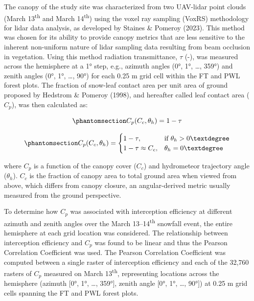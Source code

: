 \documentclass[
  letterpaper,
]{tex/uofsthesis-cs}
\begin{document}
The canopy of the study site was characterized from two UAV-lidar point
clouds (March 13\textsuperscript{th} and March 14\textsuperscript{th})
using the voxel ray sampling (VoxRS) methodology for lidar data
analysis, as developed by Staines \& Pomeroy (2023). This method was
chosen for its ability to provide canopy metrics that are less sensitive
to the inherent non-uniform nature of lidar sampling data resulting from
beam occlusion in vegetation. Using this method radiation transmittance,
\(\tau\) (-), was measured across the hemisphere at a 1° step, e.g.,
azimuth angles (0°, 1°, \ldots, 359°) and zenith angles (0°, 1°, \ldots,
90°) for each 0.25 m grid cell within the FT and PWL forest plots. The
fraction of snow-leaf contact area per unit area of ground proposed by
Hedstrom \& Pomeroy (1998), and hereafter called leaf contact area
(\(C_p\)), was then calculated as:

\begin{equation}\phantomsection\label{eq-lca}{
C_p(C_c, \theta_h) = 1-\tau
}\end{equation}

\begin{equation}\phantomsection\label{eq-tf-ode}{
C_p(C_c, \theta_h) = \begin{cases}
    1-\tau,& \text{if } \theta_h> 0°\\
    1-\tau \approx C_c ,              & \theta_h= 0°
\end{cases}
}\end{equation}

where \(C_p\) is a function of the canopy cover (\(C_c\)) and
hydrometeor trajectory angle (\(\theta_h\)). \(C_c\) is the fraction of
canopy area to total ground area when viewed from above, which differs
from canopy closure, an angular-derived metric usually measured from the
ground perspective.

To determine how \(C_p\) was associated with interception efficiency at
different azimuth and zenith angles over the March
13--14\textsuperscript{th} snowfall event, the entire hemisphere at each
grid location was considered. The relationship between interception
efficiency and \(C_p\) was found to be linear and thus the Pearson
Correlation Coefficient was used. The Pearson Correlation Coefficient
was computed between a single raster of interception efficiency and each
of the 32,760 rasters of \(C_p\) measured on March
13\textsuperscript{th}, representing locations across the hemisphere
(azimuth {[}0°, 1°, \ldots, 359°{]}, zenith angle {[}0°, 1°, \ldots,
90°{]}) at 0.25 m grid cells spanning the FT and PWL forest plots.
\end{document}
